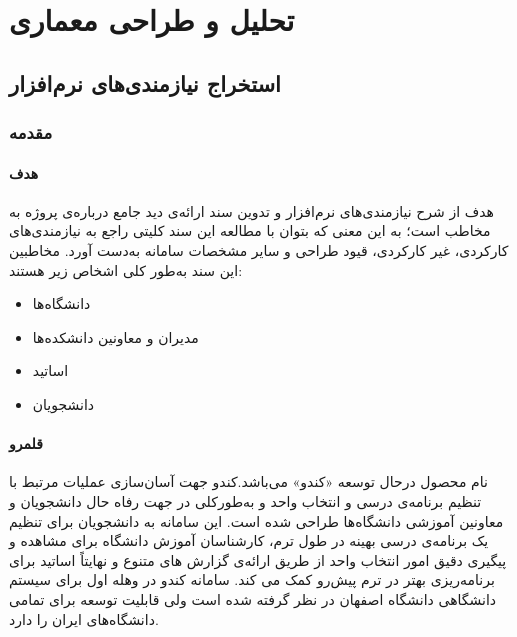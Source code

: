 \documentclass{report}
\begin{document}
\renewcommand\partname{فاز}


\tableofcontents
\newpage

\part{تحلیل و طراحی معماری}
\chapter{استخراج نیازمندی‌های نرم‌افزار}
\section{مقدمه}
\subsection{هدف}
هدف از شرح نیازمندی‌های نرم‌افزار و تدوین سند
ارائه‌ی دید جامع درباره‌ی پروژه به مخاطب است؛ به این معنی که بتوان با مطالعه این سند کلیتی راجع به نیازمندی‌های کارکردی، غیر کارکردی، قیود طراحی و سایر مشخصات سامانه به‌دست آورد.
مخاطبین این سند به‌طور کلی اشخاص زیر هستند:
\renewcommand\labelitemi{\tiny$\bullet$}
\begin{itemize}
  \item   دانشگاه‌ها 
  \item   مدیران و معاونین دانشکده‌ها 
  \item اساتید
  \item دانشجویان
\end{itemize}
\subsection{قلمرو}
نام محصول درحال توسعه «کندو» می‌باشد.کندو جهت آسان‌سازی عملیات مرتبط با تنظیم برنامه‌ی درسی و انتخاب واحد و به‌‌طورکلی در جهت رفاه حال دانشجویان و معاونین آموزشی دانشگاه‌ها طراحی شده است. این سامانه به دانشجویان برای تنظیم یک برنامه‌ی درسی بهینه در طول ترم، کارشناسان آموزش دانشگاه برای مشاهده و پیگیری دقیق امور انتخاب واحد از طریق ارائه‌ی گزارش های متنوع و نهایتاً اساتید برای برنامه‌ریزی بهتر در ترم پیش‌رو کمک می کند. سامانه کندو در وهله اول برای سیستم دانشگاهی دانشگاه اصفهان در نظر گرفته شده است ولی قابلیت توسعه برای تمامی دانشگاه‌های ایران را دارد.
\end{document}
